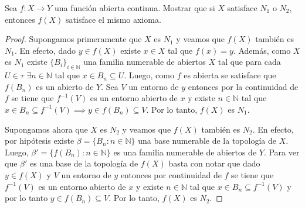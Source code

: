 \documentclass{article}
\theoremstyle{definition}
\newcommand{\N}{\mathbb{N}}
\newenvironment{ejercicio}[1]{\begin{trivlist}
\item[\hskip \labelsep {\bfseries Ejercicio}\hskip \labelsep {\bfseries #1.}]}{\end{trivlist}}
\begin{document}
\begin{ejercicio}{C4}
    Sea \( f : X \rightarrow Y \) una función abierta continua. Mostrar que si \( X \) satisface \( N_{1} \) o \( N_{2} \), entonces \( f(X) \) satisface el mismo axioma.
\end{ejercicio}
\begin{proof}
    Supongamos primeramente que \( X \) es \( N_1 \) y veamos que \( f(X) \) también es \( N_1 \). En efecto,
    dado \( y \in f(X) \) existe \( x \in X \) tal que \( f(x) = y \). Además, como \( X \) es \( N_1 \)
    existe \( {\{ B_i \}}_{i \in \N} \) una familia numerable de abiertos \( X \) tal que para cada \( U \in \tau \)
    \( \exists n \in \N \) tal que \( x \in B_n \subseteq U \). Luego, como \( f \) es abierta se satisface que
    \( f(B_n) \) es un abierto de \( Y \). Sea \( V \) un entorno de \( y \) entonces por la continuidad de \( f \) se tiene que \( f^{-1}(V) \)
    es un entorno abierto de \( x \) y existe \( n \in \N \) tal que \( x \in B_n \subseteq f^{-1}(V) \implies y \in f(B_n) \subseteq V \). Por lo tanto, \( f(X) \) es \( N_1 \).

    Supongamos ahora que \( X \) es \( N_2 \) y veamos que \( f(X) \) también es \( N_2 \). En efecto,
    por hipótesis existe \( \beta = \{ B_n : n \in \N \} \) una base numerable de la topología de \( X \).
    Luego, \( \beta' = \{ f(B_n) : n \in \N \} \) es una familia numerable de abiertos de \( Y \). Para ver que \( \beta' \) es una base de la topología de \( f(X) \) basta con notar que dado \( y \in f(X) \) y \( V \) un entorno de \( y \) entonces por continuidad de \( f \) se tiene que \( f^{-1}(V) \) es un entorno abierto de \( x \) y existe \( n \in \N \) tal que \( x \in B_n \subseteq f^{-1}(V) \) y por lo tanto \( y \in f(B_n) \subseteq V \). Por lo tanto, \( f(X) \) es \( N_2 \).
\end{proof}
\end{document}
